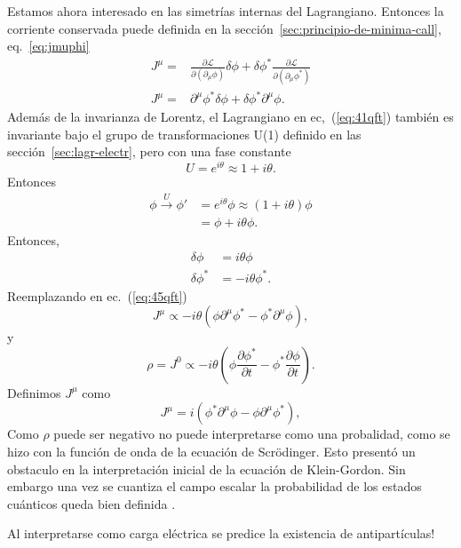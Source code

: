 Estamos ahora interesado en las simetrías internas del Lagrangiano. Entonces la corriente conservada puede definida en la sección~\ref{sec:principio-de-minima-call}, eq.~\eqref{eq:jmuphi}
\begin{align}
  J^\mu=&\frac{\partial\mathcal{L}}{\partial(\partial_\mu\phi)}\delta\phi+\delta\phi^*\frac{\partial\mathcal{L}}{\partial(\partial_\mu\phi^*)}\nonumber\\
  \label{eq:45qft}
  J^\mu=&\partial^\mu\phi^*\delta\phi+\delta\phi^*\partial^\mu\phi.
\end{align}
Además de la invarianza de Lorentz, el Lagrangiano en ec,~(\ref{eq:41qft}) también es invariante bajo el grupo de transformaciones U(1) definido en las sección~\ref{sec:lagr-electr}, pero con una fase constante
\begin{equation*}
  U=e^{i\theta}\approx1+i\theta.
\end{equation*}
Entonces
\begin{align}
  \phi\overset{U}{\longrightarrow}\phi'&=e^{i\theta}\phi\approx(1+i\theta)\phi\nonumber\\
  &=\phi+i\theta\phi.
\end{align}
Entonces,
\begin{align}
  \delta\phi&=i\theta\phi\\
  \delta\phi^*&=-i\theta\phi^*.
\end{align}
Reemplazando en ec.~(\ref{eq:45qft})
\begin{equation}
\label{eq:46qft}
  J^\mu\propto -i\theta(\phi\partial^\mu\phi^*-\phi^*\partial^\mu\phi),
\end{equation}
y
\begin{equation}
\label{eq:47qft}
  \rho=J^0\propto-i\theta(\phi\frac{\partial\phi^*}{\partial t}-\phi^*\frac{\partial\phi}{\partial t}).
\end{equation}
Definimos $J^\mu$ como
\begin{equation}
  \label{eq:48qft}
   J^\mu= i(\phi^*\partial^\mu\phi-\phi\partial^\mu\phi^*),
\end{equation}
Como $\rho$ puede ser negativo no puede interpretarse como una
probalidad, como se hizo con la función de onda de la ecuación de
Scrödinger. Esto presentó un obstaculo en la interpretación inicial de
la ecuación de Klein-Gordon. Sin embargo una vez se cuantiza el
campo escalar la probabilidad de los estados cuánticos queda bien
definida \cite{Gross}.

Al interpretarse como carga eléctrica se predice la existencia de antipartículas!


